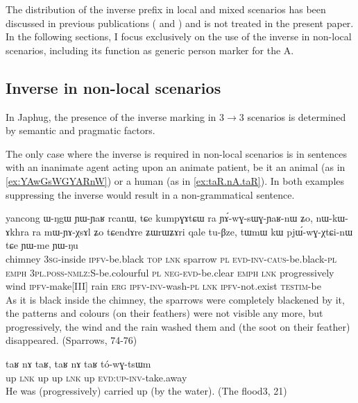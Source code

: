 \documentclass[oldfontcommands,oneside,a4paper,11pt]{article}
\newcommand{\ipa}[1]{{\phon \mbox{#1}}} %
\begin{document}
The distribution of the inverse prefix in local and mixed scenarios has been discussed in previous publications (\citealt{jacques10inverse} and \citealt{jacques14inverse}) and is not treated in the present paper. In the following sections, I focus exclusively on the use of the inverse in non-local scenarios, including its function as generic person marker for the A.

\subsection{Inverse in non-local scenarios} \label{sec:obv.jpg}
In Japhug, the presence of the inverse marking in  3$\rightarrow$3 scenarios is determined by semantic and pragmatic factors. 

The only case where the inverse is required in non-local scenarios is in sentences with an inanimate agent acting upon an animate patient, be it an animal (as in \ref{ex:YAwGsWGYARnW}) or a human (as in \ref{ex:taR.nA.taR}). In both examples suppressing the inverse would result in a non-grammatical sentence.  
 

 \begin{exe}
\ex \label{ex:YAwGsWGYARnW} 
\gll
yancong	\ipa{ɯ-ŋgɯ} 	\ipa{ɲɯ-ɲaʁ} 	\ipa{rcanɯ,} 	\ipa{tɕe} 	\ipa{kumpɣɤtɕɯ} 	\ipa{ra} 	\ipa{ɲɤ́-wɣ-sɯɣ-ɲaʁ-nɯ} 	\ipa{ʑo,} 	\ipa{nɯ-kɯ-ɤkhra} 	\ipa{ra} 	\ipa{mɯ-ɲɤ-χsɤl} 	\ipa{ʑo} 	\ipa{tɕendɤre} 	\ipa{ʑɯrɯʑɤri} 	\ipa{qale} 	\ipa{tu-βze,} 	\ipa{tɯmɯ} 	\ipa{kɯ} 	\ipa{pjɯ́-wɣ-χtɕi-nɯ} 	\ipa{tɕe} 	\ipa{ɲɯ-me} 	\ipa{ɲɯ-ŋu} \\
chimney \textsc{3sg}-inside \textsc{ipfv}-be.black \textsc{top} \textsc{lnk} sparrow \textsc{pl} \textsc{evd-inv-caus}-be.black-\textsc{pl} \textsc{emph} \textsc{3pl.poss-nmlz}:S-be.colourful \textsc{pl} \textsc{neg-evd}-be.clear \textsc{emph} \textsc{lnk} progressively wind \textsc{ipfv}-make[III] rain \textsc{erg} \textsc{ipfv-inv}-wash-\textsc{pl} \textsc{lnk} \textsc{ipfv}-not.exist \textsc{testim}-be \\
\glt As it is black inside the chimney, the sparrows were completely blackened by it, the patterns and colours (on their feathers) were not visible any more, but progressively, the wind and the rain washed them and (the soot on their feather) disappeared.
 (Sparrows, 74-76)
\end{exe}

 \begin{exe}
\ex \label{ex:taR.nA.taR} 
\gll
\ipa{taʁ}   	\ipa{nɤ}   	\ipa{taʁ,}   	\ipa{taʁ}   	\ipa{nɤ}   	\ipa{taʁ}   	\ipa{tó-wɣ-tsɯm}   \\
up \textsc{lnk} up up \textsc{lnk} up \textsc{evd:up-inv-}take.away \\
\glt He was (progressively)  carried up (by the water). (The flood3, 21)
\end{exe}
\end{document}
